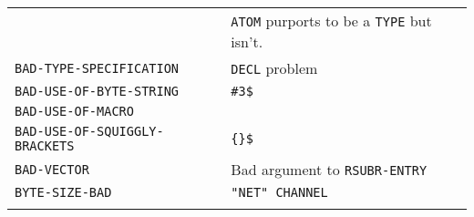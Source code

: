 \documentclass[a4paper,]{article}
\begin{document}
\begin{longtable}[]{@{}ll@{}}
\begin{minipage}[t]{0.58\columnwidth}
\end{minipage} & \begin{minipage}[t]{0.36\columnwidth}\raggedright\strut
\texttt{ATOM} purports to be a \texttt{TYPE} but isn't.\strut
\end{minipage}\tabularnewline
\begin{minipage}[t]{0.58\columnwidth}\raggedright\strut
\texttt{BAD-TYPE-SPECIFICATION}\strut
\end{minipage} & \begin{minipage}[t]{0.36\columnwidth}\raggedright\strut
\texttt{DECL} problem\strut
\end{minipage}\tabularnewline
\begin{minipage}[t]{0.58\columnwidth}\raggedright\strut
\texttt{BAD-USE-OF-BYTE-STRING}\strut
\end{minipage} & \begin{minipage}[t]{0.36\columnwidth}\raggedright\strut
\texttt{\#3\$}\strut
\end{minipage}\tabularnewline
\begin{minipage}[t]{0.58\columnwidth}\raggedright\strut
\texttt{BAD-USE-OF-MACRO}\strut
\end{minipage} & \begin{minipage}[t]{0.36\columnwidth}\raggedright\strut
\strut
\end{minipage}\tabularnewline
\begin{minipage}[t]{0.58\columnwidth}\raggedright\strut
\texttt{BAD-USE-OF-SQUIGGLY-BRACKETS}\strut
\end{minipage} & \begin{minipage}[t]{0.36\columnwidth}\raggedright\strut
\texttt{\{\}\$}\strut
\end{minipage}\tabularnewline
\begin{minipage}[t]{0.58\columnwidth}\raggedright\strut
\texttt{BAD-VECTOR}\strut
\end{minipage} & \begin{minipage}[t]{0.36\columnwidth}\raggedright\strut
Bad argument to \texttt{RSUBR-ENTRY}\strut
\end{minipage}\tabularnewline
\begin{minipage}[t]{0.58\columnwidth}\raggedright\strut
\texttt{BYTE-SIZE-BAD}\strut
\end{minipage} & \begin{minipage}[t]{0.36\columnwidth}\raggedright\strut
\texttt{"NET"\ CHANNEL}\strut
\end{minipage}\tabularnewline
\begin{minipage}[t]{0.58\columnwidth}\raggedright\strut

\end{minipage}
\end{longtable}
\end{document}
